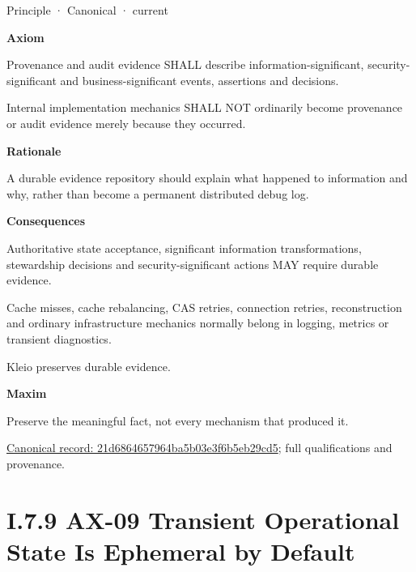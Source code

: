 \label{element:21d6864657964ba5b03e3f6b5eb29cd5}
{\small Principle · Canonical · current}\par

\par\medskip\textbf{Axiom}\par


Provenance and audit evidence SHALL describe information-significant,
security-significant and business-significant events, assertions and
decisions.



Internal implementation mechanics SHALL NOT ordinarily become provenance
or audit evidence merely because they occurred.



\par\medskip\textbf{Rationale}\par


A durable evidence repository should explain what happened to
information and why, rather than become a permanent distributed debug
log.



\par\medskip\textbf{Consequences}\par


Authoritative state acceptance, significant information transformations,
stewardship decisions and security-significant actions MAY require
durable evidence.



Cache misses, cache rebalancing, CAS retries, connection retries,
reconstruction and ordinary infrastructure mechanics normally belong in
logging, metrics or transient diagnostics.



Kleio preserves durable evidence.



\par\medskip\textbf{Maxim}\par


Preserve the meaningful fact, not every mechanism that produced it.


{\footnotesize \href{../../../../../../../../continuum/motivation/principle/21d6864657964ba5b03e3f6b5eb29cd5.md}{Canonical record: 21d6864657964ba5b03e3f6b5eb29cd5}; full qualifications and provenance.}\par
\section*{I.7.9 AX-09 Transient Operational State Is Ephemeral by Default}
\label{navigation:I.7.9}

